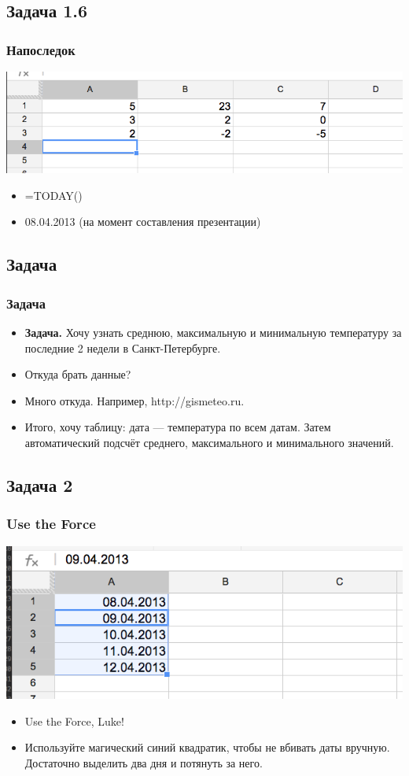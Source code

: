 \documentclass[compress,red]{beamer}
\begin{document}
\subsection{Задача 1.6}
\begin{frame}[fragile]
  \frametitle{Напоследок}
  \centerline{\includegraphics[width=1.0\textwidth]{images/11.png}}
  \begin{itemize}[<+->]
      \item =TODAY()
      \item 08.04.2013 (на момент составления презентации)
  \end{itemize}
\end{frame}

\subsection{Задача}
\begin{frame}[fragile]
  \frametitle{Задача}
  \begin{itemize}[<+->]
    \item \textbf{Задача.} Хочу узнать среднюю, максимальную и минимальную температуру за последние 2 недели в Санкт-Петербурге.
    \item Откуда брать данные?
    \item Много откуда. Например, http://gismeteo.ru.
    \item Итого, хочу таблицу: дата --- температура по всем датам. Затем автоматический подсчёт среднего, максимального и минимального значений.
  \end{itemize}
\end{frame}

\subsection{Задача 2}
\begin{frame}[fragile]
  \frametitle{Use the Force}
  \centerline{\includegraphics[width=1.0\textwidth]{images/12.png}}
  \begin{itemize}[<+->]
      \item Use the Force, Luke!
      \item Используйте магический синий квадратик, чтобы не вбивать даты вручную. Достаточно выделить два дня и потянуть за него.
  \end{itemize}
\end{frame}
\end{document}
